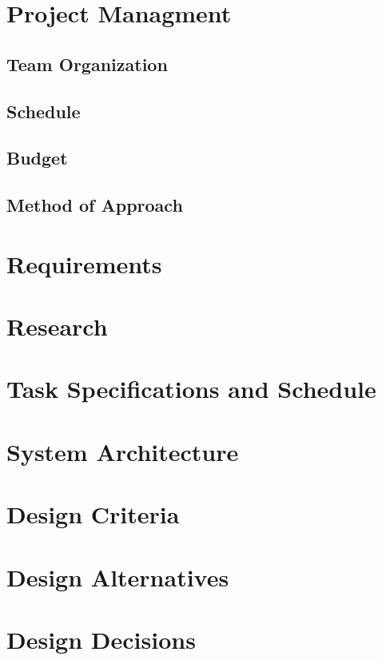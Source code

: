 \documentclass{article}
\begin{document}
\section{Project Managment}
    \subsection{Team Organization}
    \subsection{Schedule}
    \subsection{Budget}
    \subsection{Method of Approach}

\section{Requirements}


\section{Research}

\section{Task Specifications and Schedule}

\section{System Architecture}

\section{Design Criteria}

\section{Design Alternatives}

\section{Design Decisions}
\end{document}
